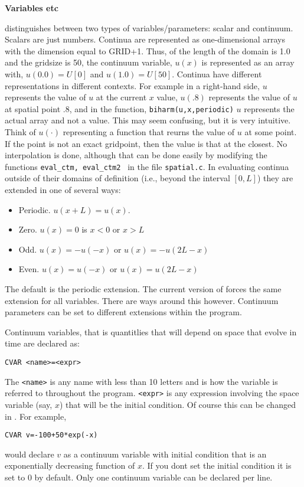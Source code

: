 \vspace{.25 in}
\begin{center}
{\bf \large Variables etc}
\end{center}
\xtc distinguishes between two types of variables/parameters: scalar
and continuum.  Scalars are just numbers.  Continua are represented as
one-dimensional arrays with the dimension equal to GRID+1.  Thus, of
the length of the domain is 1.0 and the gridsize is 50, the continuum
variable, $u(x)$ is represented as an array with, $u(0.0)=U[0]$ and
$u(1.0)=U[50].$ Continua have different representations in different
contexts.  For example in a right-hand side, $u$ represents the value
of $u$ at the current $x$ value, $u(.8)$ represents the value of $u$
at spatial point .8, and in the function, {\tt biharm(u,x,periodic)}
$u$ represents the actual array and not a value.  This may seem
confusing, but it is very intuitive.  Think of $u(\cdot)$ representing
a function that reurns the value of $u$ at some point.  If the point
is not an exact gridpoint, then the value is that at the closest.  No
interpolation is done, although that can be done easily by modifying
the functions {\tt eval\_ctm, eval\_ctm2 } in the file {\tt spatial.c}.
In evaluating continua outside of their domains of definition (i.e.,
beyond the interval $[0,L]$) they are extended in one of several ways:
\begin{itemize}
\item Periodic. $u(x+L)=u(x).$
\item Zero. $u(x)=0$ is $x<0$ or $x>L$
\item Odd. $u(x)=-u(-x)$ or $u(x)=-u(2L-x)$
\item Even. $u(x)=u(-x)$ or $u(x)=u(2L-x)$
\end{itemize}
The default is the periodic extension. The current version of \xtc
forces the same extension for all variables.  There are ways around
this however. Continuum parameters can be set to different extensions
within the program.

Continuum variables, that is quantitlies that will depend on space
that evolve in time are declared as:
\begin{verbatim}
CVAR <name>=<expr>
\end{verbatim}
The {\tt <name>} is any name with less than 10 letters and is how the
variable is referred to throughout the program.  {\tt <expr>} is any
expression involving the space variable (say, $x$) that will be the
initial condition.  Of course this can be changed in \xtc.  For
example,
\begin{verbatim}
CVAR v=-100+50*exp(-x)
\end{verbatim}
would declare $v$ as a continuum variable with initial condition that
is an exponentially decreasing function of $x.$ If you dont set the
initial condition it is set to 0 by default.  Only one continuum
variable can be declared per line.


